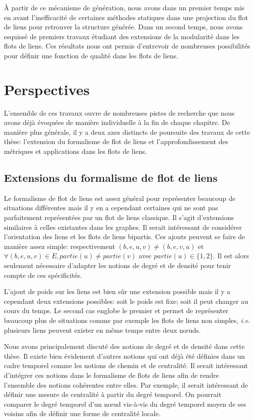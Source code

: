 \`A partir de ce mécanisme de génération, nous avons dans un premier temps mis en avant l'inefficacité de certaines méthodes statiques dans une projection du flot de liens pour retrouver la structure générée.
Dans un second temps, nous avons esquissé de premiers travaux étudiant des extensions de la modularité dans les flots de liens.
Ces résultats nous ont permis d'entrevoir de nombreuses possibilités pour définir une fonction de qualité dans les flots de liens.

\section{Perspectives}

L'ensemble de ces travaux ouvre de nombreuses pistes de recherche que nous avons déjà évoquées de manière individuelle à la fin de chaque chapitre.
De manière plus générale, il y a deux axes distincts de poursuite des travaux de cette thèse: l'extension du formalisme de flot de liens et l'approfondissement des métriques et applications dans les flots de liens.

\subsection{Extensions du formalisme de flot de liens}

Le formalisme de flot de liens est assez général pour représenter beaucoup de situations différentes mais il y en a cependant certaines qui ne sont pas parfaitement représentées par un flot de liens classique.
Il s'agit d'extensions similaires à celles existantes dans les graphes.
Il serait intéressant de considérer l'orientation des liens et les flots de liens bipartis.
Ces ajouts peuvent se faire de manière assez simple: respectivement $(b,e,u,v)\neq (b,e,v,u)$ et $\forall (b,e,u,v) \in E, partie(u)\neq partie(v)$ avec $partie(u) \in \{1,2\}$.
Il est alors seulement nécessaire d'adapter les notions de degré et de densité pour tenir compte de ces spécificités.

L'ajout de poids sur les liens est bien sûr une extension possible mais il y a cependant deux extensions possibles: soit le poids est fixe; soit il peut changer au cours du temps.
Le second cas englobe le premier et permet de représenter beaucoup plus de situations comme par exemple les flots de liens non simples, \emph{i.e.} plusieurs liens peuvent exister en même temps entre deux n\oe{}uds.

Nous avons principalement discuté des notions de degré et de densité dans cette thèse.
Il existe bien évidement d'autres notions qui ont déjà été définies dans un cadre temporel comme les notions de chemin et de centralité.
Il serait intéressant d'intégrer ces notions dans le formalisme de flots de liens afin de rendre l'ensemble des notions cohérentes entre elles.
Par exemple, il serait intéressant de définir une mesure de centralité à partir du degré temporel.
On pourrait comparer le degré temporel d'un n\oe{}ud vis-à-vis du degré temporel moyen de ses voisins afin de définir une forme de centralité locale.

